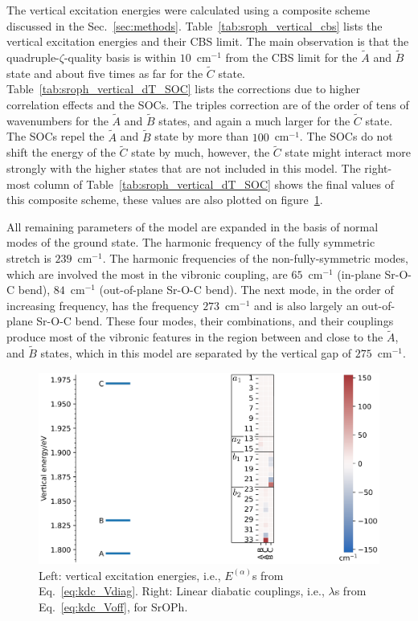 \documentclass{article}
\begin{document}
The vertical excitation energies were calculated using a composite scheme
discussed in the Sec.~\ref{sec:methods}. Table~\ref{tab:sroph_vertical_cbs}
lists the vertical excitation energies and their CBS limit. The main
observation is that the quadruple-$\zeta$-quality basis is within
$10$~cm$^{-1}$ from the CBS limit for the $\tilde{A}$ and $\tilde{B}$ state and
about five times as far for the $\tilde{C}$ state.
Table~\ref{tab:sroph_vertical_dT_SOC} lists the corrections due to higher
correlation effects and the SOCs. The triples correction are of the order of
tens of wavenumbers for the $\tilde{A}$ and $\tilde{B}$ states, and again a
much larger for the $\tilde{C}$ state. The SOCs repel the $\tilde{A}$ and
$\tilde{B}$ state by more than $100$~cm$^{-1}$. The SOCs do not shift the
energy of the $\tilde{C}$ state by much, however, the $\tilde{C}$ state might
interact more strongly with the higher states that are not included in this
model. The right-most column of Table~\ref{tab:sroph_vertical_dT_SOC} shows the
final values of this composite scheme, these values are also plotted on
figure~\ref{fig:SrCouplings}.

All remaining parameters of the model are expanded in the basis of normal modes
of the ground state. The harmonic frequency of the fully symmetric stretch is
$239$~cm$^{-1}$. The harmonic frequencies of the non-fully-symmetric modes,
which are involved the most in the vibronic coupling, are $65$~cm$^{-1}$
(in-plane Sr-O-C bend), $84$~cm$^{-1}$ (out-of-plane Sr-O-C bend). The next
mode, in the order of increasing frequency, has the frequency $273$~cm$^{-1}$
and is also largely an out-of-plane Sr-O-C bend. These four modes, their
combinations, and their couplings produce most of the vibronic features in the
region between and close to the $\tilde{A}$, and $\tilde{B}$ states, which in
this model are separated by the vertical gap of $275$~cm$^{-1}$.

\begin{figure}
    \begin{center}
        \includegraphics[width=12 cm]{./figures/SrCoupplings.pdf}
    \end{center}
    \caption{
        Left: vertical excitation energies, i.e., $E ^{(\alpha)}$s from
        Eq.~\eqref{eq:kdc_Vdiag}. Right: Linear diabatic couplings, i.e.,
        $\lambda$s from Eq.~\eqref{eq:kdc_Voff}, for SrOPh. 
    }
    \label{fig:SrCouplings}
\end{figure}
\end{document}
